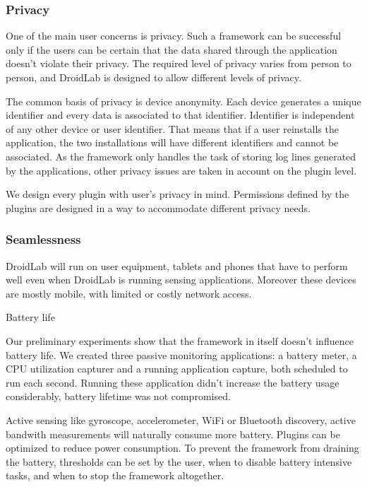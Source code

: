 \documentclass[conference,letterpaper]{IEEEtran}
\begin{document}
\subsubsection{Privacy}

One of the main user concerns is privacy. Such a framework can be successful only if the users can be certain that the data shared through the application doesn't violate their privacy. The required level of privacy varies from person to person, and DroidLab is designed to allow different levels of privacy.

The common basis of privacy is device anonymity. Each device generates a unique identifier and every data is associated to that identifier. Identifier is independent of any other device or user identifier. That means that if a user reinstalls the application, the two installations will have different identifiers and cannot be associated. As the framework only handles the task of storing log lines generated by the applications, other privacy issues are taken in account on the plugin level.

We design every plugin with user's privacy in mind. Permissions defined by the plugins are designed in a way to accommodate different privacy needs.

\subsubsection{Seamlessness}

DroidLab will run on user equipment, tablets and phones that have to perform well even when DroidLab is running sensing applications. Moreover these devices are mostly mobile, with limited or costly network access.

Battery life

Our preliminary experiments show that the framework in itself doesn't influence battery life. We created three passive monitoring applications: a battery meter, a CPU utilization capturer and a running application capture, both scheduled to run each second. Running these application didn't increase the battery usage considerably, battery lifetime was not compromised.

Active sensing like gyroscope, accelerometer, WiFi or Bluetooth discovery, active bandwith measurements will naturally consume more battery. Plugins can be optimized to reduce power consumption. To prevent the framework from draining the battery, thresholds can be set by the user, when to disable battery intensive tasks, and when to stop the framework altogether.
\end{document}
